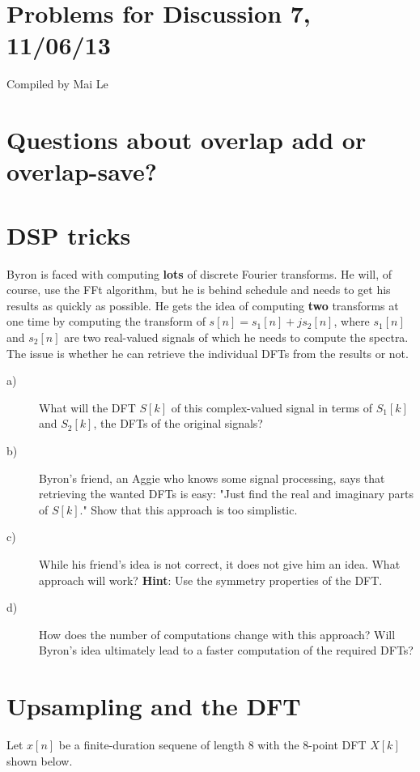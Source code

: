 \documentclass[11pt]{article}
\begin{document}
{\small
\section*{Problems for Discussion 7, 11/06/13}
Compiled by Mai Le
}

\section{Questions about overlap add or overlap-save?}

\section{DSP tricks}
Byron is faced with computing \textbf{lots} of discrete Fourier transforms. He will, of course, use the FFt algorithm, but he is behind schedule and needs to get his results as quickly as possible. He gets the idea of computing \textbf{two} transforms at one time by computing the transform of $s[n]=s_1[n]+j s_2[n]$, where $s_1[n]$ and $s_2[n]$ are two real-valued signals of which he needs to compute the spectra. The issue is whether he can retrieve the individual DFTs from the results or not.

\begin{description}
\item[a)] What will the DFT $S[k]$ of this complex-valued signal in terms of $S_1[k]$ and $S_2[k]$, the DFTs of the original signals?
\item[b)] Byron's friend, an Aggie who knows some signal processing, says that retrieving the wanted DFTs is easy: "Just find the real and imaginary parts of $S[k]$." Show that this approach is too simplistic.
\item[c)] While his friend's idea is not correct, it does not give him an idea. What approach will work? \textbf{Hint}: Use the symmetry properties of the DFT.
\item[d)] How does the number of computations change with this approach? Will Byron's idea ultimately lead to a faster computation of the required DFTs?
\end{description}


\section{Upsampling and the DFT}
Let $x[n]$ be a finite-duration sequene of length 8 with the 8-point DFT $X[k]$ shown below.
\end{document}
